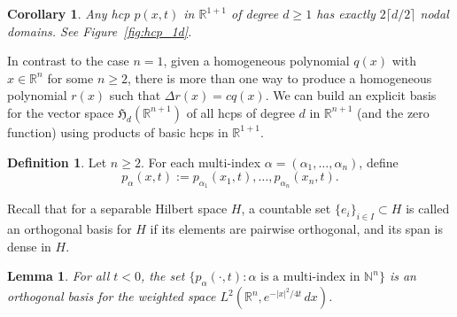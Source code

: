 \documentclass[10pt]{amsart}
\newtheorem{lemm}[theo]{Lemma}\newtheorem{prop}[theo]{Proposition}\newtheorem{coro}[theo]{Corollary}\newtheorem{conj}[theo]{Conjecture}
\theoremstyle{definition}\newtheorem{defi}[theo]{Definition}\newtheorem{rema}[theo]{Remark}\newtheorem{exam}[theo]{Example}\newtheorem{exem}[theo]{Example}\newtheorem{nota}[theo]{Notation}
\newcommand{\N}{\mathbb{N}}
\newcommand{\R}{\mathbb{R}}
\newcommand{\HCP}[1]{\mathfrak{H}_{#1}}
\begin{document}
\begin{coro}\label{cor:dim_1}
Any hcp $p(x,t)$ in $\R^{1+1}$ of degree $d\geq 1$ has exactly $2\lceil d/2\rceil$ nodal domains. See Figure~\ref{fig:hcp_1d}.
\end{coro}

In contrast to the case $n=1$, given a homogeneous polynomial $q(x)$ with $x\in\R^n$ for some $n\geq 2$, there is more than one way to produce a homogeneous polynomial $r(x)$ such that $\Delta r(x) = cq(x)$. We can build an explicit basis for the vector space $\HCP{d}(\R^{n+1})$ of all hcps of degree $d$ in $\R^{n+1}$ (and the zero function) using products of basic hcps in $\R^{1+1}$.

\begin{defi}
Let $n\geq 2$. For each multi-index $\alpha=(\alpha_1,\dots,\alpha_n)$, define
\begin{equation}
p_\alpha(x,t):=p_{\alpha_1}(x_1,t),\dots, p_{\alpha_n}(x_n,t). \label{eqn:p_alpha}
\end{equation}
\end{defi}

{Recall that for a separable Hilbert space $H$, a countable set $\{e_i\}_{i \in I} \subset H$ is called an orthogonal basis for $H$ if its elements are pairwise orthogonal, and its span is dense in $H$.}

\begin{lemm}\label{cor:orth}
For all $t<0$, the set $\{p_\alpha(\cdot,t):\alpha\text{ is a multi-index in }\N^n\}$ is an orthogonal basis for the weighted space $L^2(\R^n,e^{-|x|^2/4t}\,dx)$.
\end{lemm}
\end{document}
